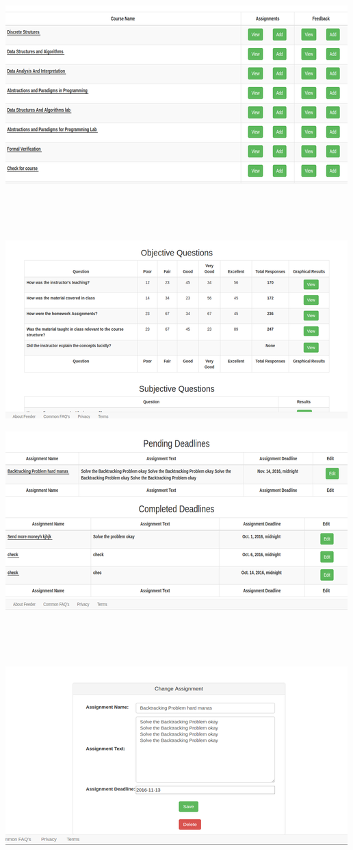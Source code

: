\documentclass[11pt]{report}
\begin{document}
\begin{outline}
\begin{outline}
\newpage
\includegraphics{instruct_home}   \\ \\ \\ \\ \\
\includegraphics{o_feedback} 

\newpage
\includegraphics{deadlines}   \\ \\ \\ \\ \\
\includegraphics{deadline} 


\end{outline}
\end{outline}
\end{document}
